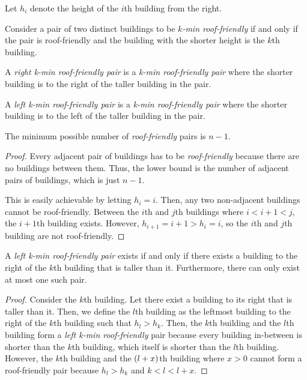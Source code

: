 \documentclass[10pt]{../usamts}
\begin{document}
\begin{solution}{3}

\begin{definition}
    Let $h_i$ denote the height of the $i$th building from the right.
\end{definition}

\begin{definition}
    Consider a pair of two distinct buildings to be \textit{$k$-min roof-friendly} if and only if the pair is roof-friendly and the building with the shorter height is the $k$th building. 
\end{definition}
\begin{definition}
A \textit{right k-min roof-friendly pair} is a \textit{k-min roof-friendly pair} where the shorter building is to the right of the taller building in the pair.
\end{definition}

\begin{definition}
A \textit{left k-min roof-friendly pair} is a \textit{k-min roof-friendly pair} where the shorter building is to the left of the taller building in the pair.
\end{definition}

\begin{claim}
    The minimum possible number of \textit{roof-friendly} pairs is $\boxed{n-1}$.
\end{claim}

\begin{proof}
    Every adjacent pair of buildings has to be \textit{roof-friendly} because there are no buildings between them. Thus, the lower bound is the number of adjacent pairs of buildings, which is just $n-1$.
    
    This is easily achievable by letting $h_i = i$. Then, any two non-adjacent buildings cannot be roof-friendly. Between the $i$th and $j$th buildings where $i < i+1 < j$, the $i+1$th building exists. However, $h_{i+1} = i+1 > h_i = i$, so the $i$th and $j$th building are not roof-friendly.
\end{proof}

\begin{claim}
    A \textit{left k-min roof-friendly pair} exists if and only if there exists a building to the right of the $k$th building that is taller than it. Furthermore, there can only exist at most one such pair.
    \label{claim:kminleft}
\end{claim}

\begin{proof}
    Consider the $k$th building. Let there exist a building to its right that is taller than it. Then, we define the $l$th building as the leftmost building to the right of the $k$th building such that $h_l > h_k$. Then, the $k$th building and the $l$th building form a \textit{left k-min roof-friendly} pair because every building in-between is shorter than the $k$th building, which itself is shorter than the $l$th building. However, the $k$th building and the $\left( l+x \right)$th building where $x > 0$ cannot form a roof-friendly pair because $h_l > h_k$ and $k < l < l+x$.
    

\end{proof}
\end{solution}
\end{document}
